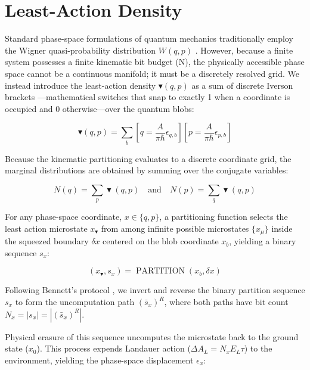 \documentclass[%
  aps, reprint, prl, amsmath,amssymb
]{revtex4-2}
\begin{document}
\section{Least-Action Density}


Standard phase-space formulations of quantum mechanics traditionally employ the Wigner quasi-probability distribution $W(q,p)$ \cite{Wigner1932}. However, because a finite system possesses a finite kinematic bit budget (N), the physically accessible phase space cannot be a continuous manifold; it must be a discretely resolved grid. We instead introduce the least-action density $\blacktriangledown(q,p)$ as a sum of discrete Iverson brackets \cite{Knuth1992}—mathematical switches that snap to exactly 1 when a coordinate is occupied and 0 otherwise—over the quantum blobs:

\begin{equation}
\label{eq:JointErasure}
\blacktriangledown(q,p) = \sum_{b} \left[ q = \frac{A}{\pi \hbar} \epsilon_{q,b} \right] \left[ p = \frac{A}{\pi \hbar} \epsilon_{p,b} \right]
\end{equation}

Because the kinematic partitioning evaluates to a discrete coordinate grid, the marginal distributions are obtained by summing over the conjugate variables:

\begin{equation}
\label{eq:Marginals}
N(q) = \sum_{p} \blacktriangledown(q,p)
\quad \text{and} \quad
N(p) = \sum_{q} \blacktriangledown(q,p)
\end{equation}

For any phase-space coordinate, $x \in \{q, p\}$, a partitioning function selects the least action microstate $x_\blacktriangledown$ from among infinite possible microstates $\{x_\mu\}$ inside the squeezed boundary $\delta x$ centered on the blob coordinate $x_b$, yielding a binary sequence $s_x$:

\begin{equation}
\label{eq:PartitionFunction}
(x_\blacktriangledown, s_x) = \operatorname{PARTITION}(x_b, \delta x)
\end{equation}

Following Bennett's protocol \cite{Bennett1973}, we invert and reverse the binary partition sequence $s_x$ to form the uncomputation path $(\bar{s}_x)^R$, where both paths have bit count $N_x = |s_x| = |(\bar{s}_x)^R|$.

Physical erasure of this sequence uncomputes the microstate back to the ground state ($x_0$). This process expends Landauer action ($\Delta A_L = N_x E_L \tau$) to the environment, yielding the phase-space displacement $\epsilon_x$:
\end{document}
